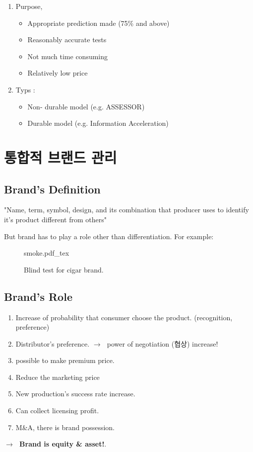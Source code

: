 \documentclass[12pt]{article}
\newcommand{\ra}{$\rightarrow \text{ }$}
\newcommand{\tb}{\textbf}
\begin{document}
\begin{enumerate}
	\item Purpose, \begin{itemize}
		\item Appropriate prediction made (75\% and above)
		\item Reasonably accurate tests
		\item Not much time consuming
		\item Relatively low price
	\end{itemize}
	\item Typs :
	\begin{itemize}
		\item Non- durable model (e.g. ASSESSOR)
		\item Durable model (e.g. Information Acceleration)
	\end{itemize}

\end{enumerate}



\section{통합적 브랜드 관리}

\subsection{Brand's Definition}

"Name, term, symbol, design, and its combination that producer uses to identify it's product different from others"

But brand has to play a role other than differentiation. For example:

\begin{figure}[H]
	\centering
	\def\svgwidth{\columnwidth}
	{smoke.pdf_tex}
	\caption{Blind test for cigar brand.}
	\label{fig:smoke}
\end{figure}

\subsection{Brand's Role}

\begin{enumerate}
	\item Increase of probability that consumer choose the product. (recognition, preference)
	\item Distributor's preference. \ra power of negotiation (협상) increase!
	\item possible to make premium price.
	\item Reduce the marketing price
	\item New production's success rate increase.
	\item Can collect licensing profit.
	\item M&A, there is brand possession.

\end{enumerate}
\ra \tb{Brand is equity & asset!}.
\end{document}
